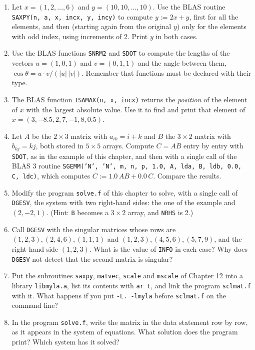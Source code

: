 \begin{enumerate}
    \item Let $x = (1, 2, \ldots, 6)$ and $y = (10, 10, \ldots, 10)$. Use the BLAS routine \texttt{SAXPY(n, a, x, incx, y, incy)} to compute $y := 2x + y$, first for all the elements, and then (starting again from the original $y$) only for the elements with odd index, using increments of 2. Print $y$ in both cases.
    \item Use the BLAS functions \texttt{SNRM2} and \texttt{SDOT} to compute the lengths of the vectors $u = (1, 0, 1)$ and $v = (0, 1, 1)$ and the angle between them, $\cos\theta = u \cdot v / (|u|\,|v|)$. Remember that functions must be declared with their type.
    \item The BLAS function \texttt{ISAMAX(n, x, incx)} returns the \emph{position} of the element of $x$ with the largest absolute value. Use it to find and print that element of $x = (3, -8.5, 2, 7, -1, 8, 0.5)$.
    \item Let $A$ be the $2 \times 3$ matrix with $a_{ik} = i + k$ and $B$ the $3 \times 2$ matrix with $b_{kj} = kj$, both stored in $5 \times 5$ arrays. Compute $C = AB$ entry by entry with \texttt{SDOT}, as in the example of this chapter, and then with a single call of the BLAS 3 routine \texttt{SGEMM('N', 'N', m, n, p, 1.0, A, lda, B, ldb, 0.0, C, ldc)}, which computes $C := 1.0\,AB + 0.0\,C$. Compare the results.
    \item Modify the program \texttt{solve.f} of this chapter to solve, with a single call of \texttt{DGESV}, the system with two right-hand sides: the one of the example and $(2, -2, 1)$. (Hint: \texttt{B} becomes a $3 \times 2$ array, and \texttt{NRHS} is 2.)
    \item Call \texttt{DGESV} with the singular matrices whose rows are $(1, 2, 3), (2, 4, 6), (1, 1, 1)$ and $(1, 2, 3), (4, 5, 6), (5, 7, 9)$, and the right-hand side $(1, 2, 3)$. What is the value of \texttt{INFO} in each case? Why does \texttt{DGESV} not detect that the second matrix is singular?
    \item Put the subroutines \texttt{saxpy}, \texttt{matvec}, \texttt{scale} and \texttt{mscale} of Chapter 12 into a library \texttt{libmyla.a}, list its contents with \texttt{ar t}, and link the program \texttt{sclmat.f} with it. What happens if you put \texttt{-L. -lmyla} before \texttt{sclmat.f} on the command line?
    \item In the program \texttt{solve.f}, write the matrix in the data statement row by row, as it appears in the system of equations. What solution does the program print? Which system has it solved?
\end{enumerate}
